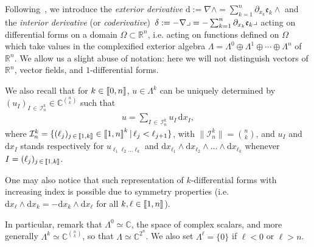 \documentclass[AHL,Unicode,longabstracts,published]{cedram}
\newcommand{\bbR}{\mathbb{R}}
\newcommand{\bbC}{\mathbb{C}}
\newcommand{\rmd}{\mathrm{d}}
\newcommand{\clI}{\mathcal{I}}
\newcommand{\fke}{\mathfrak{e}}
\newcommand{\llbracket}{\mathopen{[\mkern -2.7mu[}}
\newcommand{\rrbracket}{\mathclose{]\mkern -2.7mu]}}
\newcommand{\llb}{\llbracket}
\newcommand{\rrb}{\rrbracket}
\begin{document}
Following~\cite{McintoshMonniaux2018,Monniaux2021}, we introduce the \emph{exterior derivative} $\rmd:=\nabla \wedge=\sum_{k=1}^{n} \partial_{x_k} \fke _{k} \wedge$ and the \emph{interior derivative} (or \emph{coderivative}) $\left.{\delta}:=-\nabla\lrcorner=-\sum_{k=1}^{n} \partial_{x_k} \fke _{k}\right\lrcorner$ acting on differential forms on a domain $\Omega \subset \bbR^{n}$, i.e. acting on functions defined on $\Omega$ which take values in the complexified exterior algebra $\Lambda=\Lambda^{0} \oplus \Lambda^{1} \oplus \cdots \oplus \Lambda^{n}$ of $\bbR^{n}$. We allow us a slight abuse of notation: here we will not distinguish vectors of $\bbR^n$, vector fields, and $1$-differential forms.

We also recall that for $k\in \llb 0,n\rrb$, $u \in \Lambda^k$ can be uniquely determined by $(u_{I})_{I\,\in\,\clI^k_n}\in\bbC^{\binom{n}{k}}$ such that
\begin{align*}
u = \sum_{I\,\in\,\clI^k_n} u_{I} \,\rmd x_{I},
\end{align*}
where $\clI^k_n=\{(\ell_j)_{j\,\in\,\llb 1,k\rrb}\in\llb 1,n\rrb^k\,|\, \ell_j< \ell_{j+1}\}$, with $\|\clI^k_n\| = {\binom{n}{k}}$, and $u_{I}$ and $\rmd x_{I}$ stands respectively for $u_{\ell_1 \ell_2\ldots \ell_k}$ and $\rmd x_{\ell_1}\wedge\rmd x_{\ell_2}\wedge\ldots\wedge\rmd x_{\ell_k}$ whenever $I=(\ell_j)_{j\,\in\,\llb 1,k\rrb}$.

One may also notice that such representation of $k$-differential forms with increasing index is possible due to symmetry properties (i.e. $\rmd x_{\ell}\wedge\rmd x_{k} = - \rmd x_{k}\wedge\rmd x_{\ell}$ for all $k,\ell\in\llb 1,n\rrb$).

In particular, remark that $\Lambda^{0}\simeq \bbC$, the space of complex scalars, and more generally $\Lambda^k\simeq \bbC^{{\binom{n}{k}}}$, so that $\Lambda \simeq \bbC^{2^n}$. We also set $\Lambda^{\ell}=\{0\}$ if $\ell<0$ or $\ell>n$.
\end{document}
